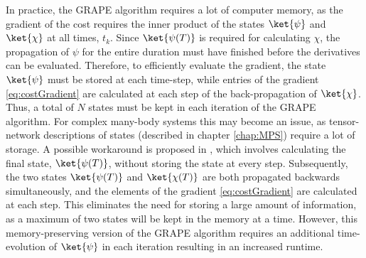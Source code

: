 In practice, the GRAPE algorithm requires a lot of computer memory, as the gradient of the cost requires the inner product of the states $\ket{\psi}$ and $\ket{\chi}$ at all times, $t_k$. 
Since $\ket{\psi (T)}$ is required for calculating $\chi$, the propagation of $\psi$ for the entire duration must have finished before the derivatives can be evaluated.
Therefore, to efficiently evaluate the gradient, the state $\ket{\psi}$ must be stored at each time-step, while entries of the gradient \eqref{eq:costGradient} are calculated at each step of the back-propagation of $\ket{\chi}$. Thus, a total of $N$ states must be kept in each iteration of the GRAPE algorithm. For complex many-body systems this may become an issue, as tensor-network descriptions of states (described in chapter \ref{chap:MPS}) require a lot of storage. A possible workaround is proposed in \cite{Mennemann2015}, which involves calculating the final state, $\ket{\psi (T)}$, without storing the state at every step. Subsequently, the two states $\ket{\psi (T)}$ and $\ket{\chi (T)}$ are both propagated backwards simultaneously, and the elements of the gradient \eqref{eq:costGradient} are calculated at each step. This eliminates the need for storing a large amount of information, as a maximum of two states will be kept in the memory at a time. However, this memory-preserving version of the GRAPE algorithm requires an additional time-evolution of $\ket{\psi}$ in each iteration resulting in an increased runtime.


